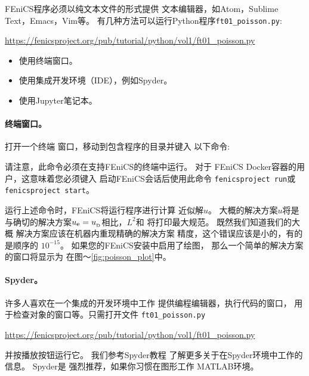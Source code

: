 FEniCS程序必须以纯文本文件的形式提供
文本编辑器，如Atom，Sublime Text，Emacs，Vim等。
有几种方法可以运行Python程序{\nolinkurl{ft01_poisson.py}}:
\begin{center}
  \url{https://fenicsproject.org/pub/tutorial/python/vol1/ft01_poisson.py}
\end{center}

\begin{itemize}
 \item 使用终端窗口。

 \item 使用集成开发环境（IDE），例如Spyder。

 \item 使用Jupyter笔记本。
\end{itemize}

\noindent
\paragraph{终端窗口。}

打开一个终端
窗口，移动到包含程序的目录并键入
以下命令:


请注意，此命令必须在支持FEniCS的终端中运行。 对于
FEniCS Docker容器的用户，这意味着您必须键入
启动FEniCS会话后使用此命令
\texttt{fenicsproject run}或\texttt{fenicsproject start}。

运行上述命令时，FEniCS将运行程序进行计算
近似解$u$。 大概的解决方案$u$将是
与确切的解决方案$\uex = \ub$相比，$L^2$和
将打印最大规范。 既然我们知道我们的大概
解决方案应该在机器内重现精确的解决方案
精度，这个错误应该是小的，有的是顺序的
$10^{-15}$。 如果您的FEniCS安装中启用了绘图，
那么一个简单的解决方案的窗口将显示为
在图〜\ref{fig:poisson_plot}中。

\paragraph{Spyder。}

许多人喜欢在一个集成的开发环境中工作
提供编程编辑器，执行代码的窗口，
用于检查对象的窗口等。只需打开文件
{\nolinkurl{ft01_poisson.py}}
\begin{center}
  \url{https://fenicsproject.org/pub/tutorial/python/vol1/ft01_poisson.py}
\end{center}
并按播放按钮运行它。 我们参考Spyder教程
了解更多关于在Spyder环境中工作的信息。 Spyder是
强烈推荐，如果你习惯在图形工作
MATLAB环境。

